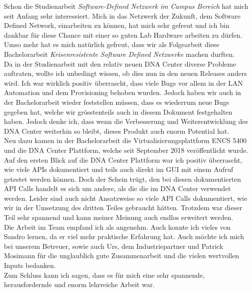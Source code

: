 Schon die Studienarbeit \textit{Software-Defined Netzwerk im Campus Bereich} hat mich seit Anfang sehr interessiert. Mich in das Netzwerk der Zukunft, dem Software Defined Network, einarbeiten zu können, hat mich sehr gefreut und ich bin dankbar für diese Chance mit einer so guten Lab Hardware arbeiten zu dürfen. Umso mehr hat es mich natürlich gefreut, dass wir als Folgearbeit diese Bachelorarbeit \textit{Krisenresistente Software Defined Netzwerke} machen durften. \\
Da in der Studienarbeit mit den relativ neuen DNA Center diverse Probleme auftraten, wollte ich unbedingt wissen, ob dies nun in den neuen Releases anders wird. Ich war wirklich positiv überrascht, dass viele Bugs vor allem in der LAN Automation und dem Provisioning behoben wurden. Jedoch haben wir auch in der Bachelorarbeit wieder feststellen müssen, dass es wiederrum neue Bugs gegeben hat, welche wir grösstenteils auch in diesem Dokument festgehalten haben. Jedoch denke ich, dass wenn die Verbesserung und Weiterentwicklung des DNA Center weiterhin so bleibt, dieses Produkt auch enorm Potential hat. \\
Neu dazu kamen in der Bachelorarbeit die Virtualisierungsplattform ENCS 5400 und die DNA Center Plattform, welche seit September 2018 veröffentlicht wurde. Auf den ersten Blick auf die DNA Center Plattform war ich positiv überrascht, wie viele APIs dokumentiert und teils auch direkt im GUI mit einem Aufruf getestet werden können. Doch der Schein trügt, den bei diesen dokumentierten API Calls handelt es sich um andere, als die die im DNA Center verwendet werden. Leider sind auch nicht Ansatzweise so viele API Calls dokumentiert, wie wir in der Umsetzung des dritten Teiles gebraucht hätten. Trotzdem war dieser Teil sehr spannend und kann meiner Meinung auch endlos erweitert werden. \\
Die Arbeit im Team empfand ich als angenehm. Auch konnte ich vieles von Sandro lernen, da er viel mehr praktische Erfahrung hat. Auch möchte ich mich bei unserem Betreuer, sowie auch Urs, dem Industriepartner und Patrick Mosimann für die unglaublich gute Zusammenarbeit und die vielen wertvollen Inputs bedanken. \\
Zum Schluss kann ich sagen, dass es für mich eine sehr spannende, herausfordernde und enorm lehrreiche Arbeit war.